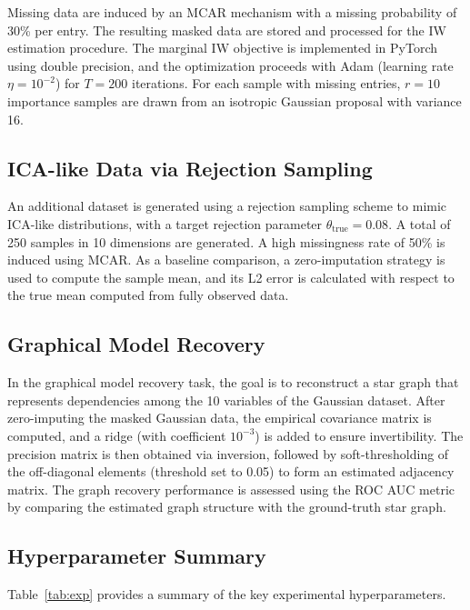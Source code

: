 \documentclass{article}
\begin{document}
Missing data are induced by an MCAR mechanism with a missing probability of 30\% per entry. The resulting masked data are stored and processed for the IW estimation procedure. The marginal IW objective is implemented in PyTorch using double precision, and the optimization proceeds with Adam (learning rate $\eta=10^{-2}$) for $T=200$ iterations. For each sample with missing entries, $r=10$ importance samples are drawn from an isotropic Gaussian proposal with variance 16.

\subsection{ICA-like Data via Rejection Sampling}
An additional dataset is generated using a rejection sampling scheme to mimic ICA-like distributions, with a target rejection parameter $\theta_{\text{true}}=0.08$. A total of 250 samples in 10 dimensions are generated. A high missingness rate of 50\% is induced using MCAR. As a baseline comparison, a zero-imputation strategy is used to compute the sample mean, and its L2 error is calculated with respect to the true mean computed from fully observed data.

\subsection{Graphical Model Recovery}
In the graphical model recovery task, the goal is to reconstruct a star graph that represents dependencies among the 10 variables of the Gaussian dataset. After zero-imputing the masked Gaussian data, the empirical covariance matrix is computed, and a ridge (with coefficient $10^{-3}$) is added to ensure invertibility. The precision matrix is then obtained via inversion, followed by soft-thresholding of the off-diagonal elements (threshold set to 0.05) to form an estimated adjacency matrix. The graph recovery performance is assessed using the ROC AUC metric by comparing the estimated graph structure with the ground-truth star graph.

\subsection{Hyperparameter Summary}
Table~\ref{tab:exp} provides a summary of the key experimental hyperparameters.
\end{document}

